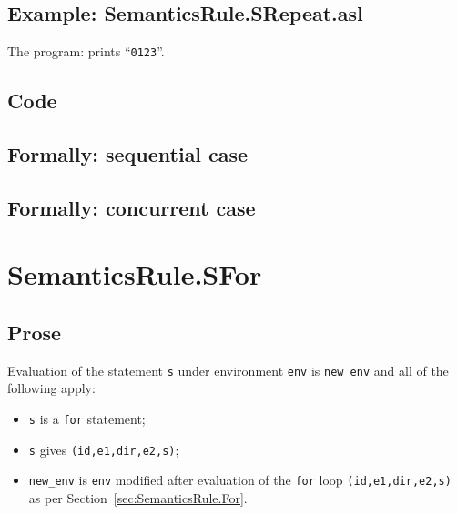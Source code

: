 \documentclass{book}
\begin{document}
    \subsection{Example: SemanticsRule.SRepeat.asl}
    The program:
    prints ``\texttt{0123}''.

  \subsection{Code}

\begin{emptyformal}
  \subsection{Formally: sequential case}

  \subsection{Formally: concurrent case}
\end{emptyformal}


\section{SemanticsRule.SFor \label{sec:SemanticsRule.SFor}}

    \subsection{Prose}
  Evaluation of the statement \texttt{s} under environment \texttt{env} is
\texttt{new\_env} and all of the following apply:
    \begin{itemize}
    \item \texttt{s} is a \texttt{for} statement;
    \item \texttt{s} gives \texttt{(id,e1,dir,e2,s)};
    \item \texttt{new\_env} is \texttt{env} modified after evaluation of the \texttt{for} loop \texttt{(id,e1,dir,e2,s)} as per Section~\ref{sec:SemanticsRule.For}. 
    \end{itemize}
\end{document}
